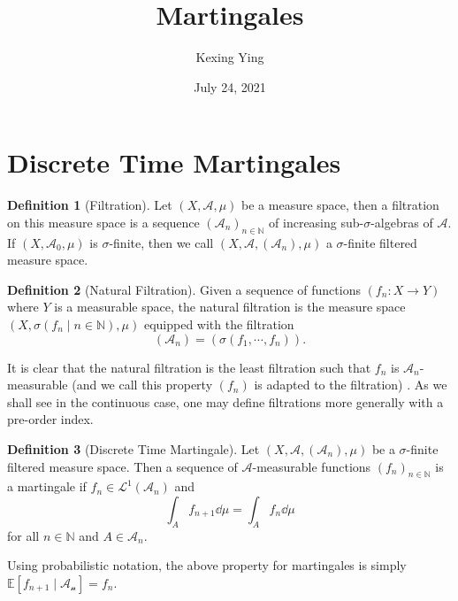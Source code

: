 \documentclass[]{article}
\title{Martingales}
\author{Kexing Ying}
\date{July 24, 2021}
\theoremstyle{definition}
\theoremstyle{definition}
\newtheorem{definition}{Definition}[section]
\begin{document}
\maketitle

{
\hypersetup{linkcolor=}
\setcounter{tocdepth}{2}
\tableofcontents
}
\newpage

\section{Discrete Time Martingales}

\begin{definition}[Filtration]
  Let \((X, \mathcal{A}, \mu)\) be a measure space, then a filtration on this 
  measure space is a sequence \((\mathcal{A}_n)_{n \in \mathbb{N}}\) of 
  increasing sub-\(\sigma\)-algebras of \(\mathcal{A}\). If 
  \((X, \mathcal{A}_0, \mu)\) is \(\sigma\)-finite, then we call 
  \((X, \mathcal{A}, (\mathcal{A}_n), \mu)\) a \(\sigma\)-finite filtered 
  measure space.
\end{definition}

\begin{definition}[Natural Filtration]
  Given a sequence of functions \((f_n : X \to Y)\) where \(Y\) is a measurable 
  space, the natural filtration is the measure space 
  \((X, \sigma(f_n \mid n \in \mathbb{N}), \mu)\) equipped with the filtration
  \[(\mathcal{A}_n) = (\sigma(f_1, \cdots, f_n)).\]
\end{definition}

It is clear that the natural filtration is the least filtration such that \(f_n\) 
is \(\mathcal{A}_n\)-measurable (and we call this property \((f_n)\) is adapted 
to the filtration) . As we shall see in the continuous case, one 
may define filtrations more generally with a pre-order index. 

\begin{definition}[Discrete Time Martingale]
  Let \((X, \mathcal{A}, (\mathcal{A}_n), \mu)\) be a \(\sigma\)-finite filtered 
  measure space. Then a sequence of \(\mathcal{A}\)-measurable functions 
  \((f_n)_{n \in \mathbb{N}}\) is a martingale if 
  \(f_n \in \mathcal{L}^1(\mathcal{A}_n)\) and 
  \[\int_A f_{n + 1} \dd \mu = \int_A f_n \dd \mu\]
  for all \(n \in \mathbb{N}\) and \(A \in \mathcal{A}_n\).
\end{definition}

Using probabilistic notation, the above property for martingales is simply 
\(\mathbb{E}[f_{n + 1} \mid \mathcal{A_n}] = f_n\).
\end{document}
